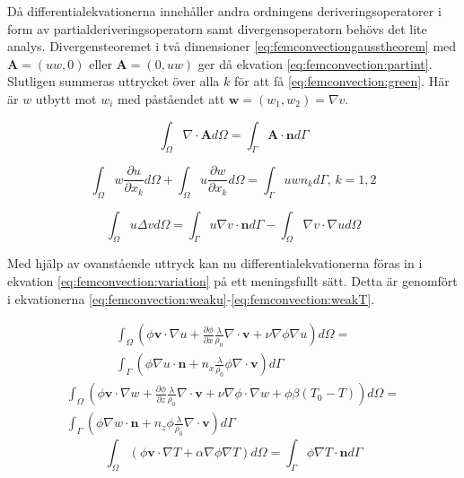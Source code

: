 \noindent
Då differentialekvationerna innehåller andra ordningens deriveringsoperatorer i form av
partialderiveringsoperatorn samt divergensoperatorn behövs det lite analys.
Divergensteoremet i två dimensioner \eqref{eq:femconvectiongausstheorem}
med $\mathbf{A} = (uw, 0)$ eller $\mathbf{A} = (0, uw)$ ger då ekvation
\eqref{eq:femconvection:partint}. Slutligen summeras uttrycket över alla
$k$ för att få \eqref{eq:femconvection:green}. Här är $w$ utbytt mot $w_i$ med
påståendet att $\mathbf{w} = (w_1, w_2) = \nabla v$. \cite{johnson2009}

\begin{equation}
\label{eq:femconvectiongausstheorem}
\int_\Omega \nabla\cdot \mathbf{A} d\Omega = \int_\Gamma \mathbf{A}\cdot\mathbf{n} d\Gamma
\end{equation} 

\begin{equation}
\label{eq:femconvection:partint}
\int_\Omega w\frac{\partial u}{\partial x_k} d\Omega +
\int_\Omega u\frac{\partial w}{\partial x_k} d\Omega =
\int_\Gamma uwn_k d\Gamma\mbox{,   }k=1,2
\end{equation}

\begin{equation}
\label{eq:femconvection:green}
\int_\Omega u\Delta v d\Omega =
\int_\Gamma u\nabla v\cdot\mathbf{n}d\Gamma-\int_\Omega \nabla v\cdot\nabla u d\Omega
\end{equation}

\noindent
Med hjälp av ovanstående uttryck kan nu differentialekvationerna föras in i
ekvation \eqref{eq:femconvection:variation} på ett meningsfullt sätt. Detta är genomfört i 
ekvationerna \eqref{eq:femconvection:weaku}-\eqref{eq:femconvection:weakT}.

\begin{align}
\int_\Omega \left(\phi\mathbf{v}\cdot\nabla u + 
\frac{\partial \phi}{\partial x}\frac{\lambda}{\rho_0}\nabla\cdot\mathbf{v}
+\nu\nabla\phi\nabla u\right)d\Omega = \nonumber \\
\int_\Gamma\left( \phi\nabla u\cdot\mathbf{n} + 
n_x\frac{\lambda}{\rho_0}\phi\nabla\cdot\mathbf{v}\right)d\Gamma
\label{eq:femconvection:weaku}
\end{align}
\begin{align}
\int_\Omega\left(\phi\mathbf{v}\cdot\nabla w
+ \frac{\partial \phi}{\partial z} \frac{\lambda}{\rho_0}\nabla\cdot\mathbf{v}
+ \nu\nabla\phi\cdot\nabla w + \phi\beta(T_0-T)\right)d\Omega
= \nonumber \\
\int_\Gamma\left(\phi\nabla w\cdot\mathbf{n} +
n_z\phi\frac{\lambda}{\rho_0}\nabla\cdot\mathbf{v}\right)d\Gamma
\label{eq:femconvection:weakw}
\end{align}
\begin{equation}
\int_\Omega\left(\phi\mathbf{v}\cdot\nabla T + \alpha\nabla\phi\nabla T\right)d\Omega
= \int_\Gamma \phi\nabla T\cdot\mathbf{n}d\Gamma
\label{eq:femconvection:weakT}
\end{equation}


